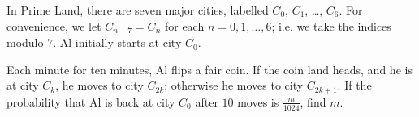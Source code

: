 In Prime Land, there are seven major cities, labelled $C_0$, $C_1$, \dots, $C_6$. For convenience, we let $C_{n+7} = C_n$ for each $n=0,1,\dots,6$; {i.e.} we take the indices modulo $7$.  Al initially starts at city $C_0$. 

Each minute for ten minutes, Al flips a fair coin.  If the coin land heads, and he is at city $C_k$, he moves to city $C_{2k}$; otherwise he moves to city $C_{2k+1}$.  If the probability that Al is back at city $C_0$ after $10$ moves is $\frac{m}{1024}$, find $m$.
